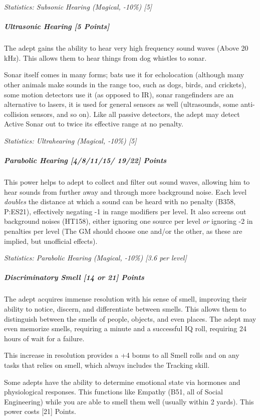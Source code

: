 \begin{multicols}{3}
		\textcolor{OliveGreen}{\textit{Statistics: Subsonic Hearing (Magical, -10\%) [5] }}
	
	\subparagraph{Ultrasonic Hearing [5 Points]}
	
		The adept gains the ability to hear very high frequency sound waves (Above 20 kHz). This allows them to hear things from dog whistles to sonar. 
		
		Sonar itself comes in many forms; bats use it for echolocation (although many other animals make sounds in the range too, such as dogs, birds, and crickets), some motion detectors use it (as opposed to IR), sonar rangefinders are an alternative to lasers, it is used for general sensors as well (ultrasounds, some anti-collision sensors, and so on). Like all passive detectors, the adept may detect Active Sonar out to twice its effective range at no penalty.
	
		\textcolor{OliveGreen}{\textit{Statistics: Ultrahearing (Magical, -10\%) [5] }}
	
	\subparagraph{Parabolic Hearing [4/8/11/15/ 19/22] Points}
	
		This power helps to adept to collect and filter out sound waves, allowing him to hear sounds from further away and through more background noise. Each level \textit{doubles} the distance at which a sound can be heard with no penalty (B358, P:ES21), effectively negating -1 in range modifiers per level. It also screens out background noises (HT158), either ignoring one source per level \textit{or} ignoring -2 in penalties per level (The GM should choose one and/or the other, as these are implied, but unofficial effects).
	
		\textcolor{OliveGreen}{\textit{Statistics: Parabolic Hearing (Magical, -10\%) [3.6 per level] }}
		
	\subparagraph{Discriminatory Smell [14 or 21] Points}
	
		The adept acquires immense resolution with his sense of smell, improving their ability to notice, discern, and differentiate between smells. This allows them to distinguish between the smells of people, objects, and even places. The adept may even memorize smells, requiring a minute and a successful IQ roll, requiring 24 hours of wait for a failure.
		
		This increase in resolution provides a +4 bonus to all Smell rolls and on any tasks that relies on smell, which always includes the Tracking skill.
		
		Some adepts have the ability to determine emotional state via hormones and physiological responses. This functions like Empathy (B51, all of Social Engineering) while you are able to smell them well (usually within 2 yards). This power costs [21] Points.
	

\end{multicols}
